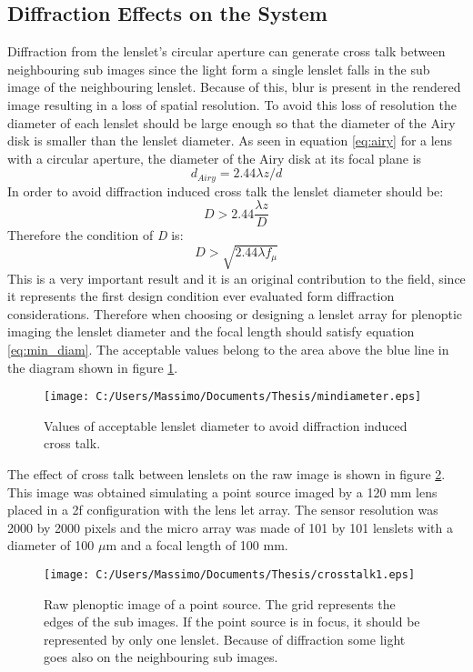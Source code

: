 \subsection{Diffraction Effects on the System}
\label{sec:diffraction}
Diffraction from the lenslet's circular aperture can generate cross talk between neighbouring sub images since the light form a single lenslet falls in the sub image of the neighbouring lenslet. Because of this, blur is present in the rendered image resulting in a loss of spatial resolution. To avoid this loss of resolution the diameter of each lenslet should be large enough so that the diameter of the Airy disk is smaller than the lenslet diameter. As seen in equation \ref{eq:airy} for a lens with a circular aperture, the diameter of the Airy disk at its focal plane is
\begin{equation}
\label{eq:airy1}
d_{Airy} = 2.44\lambda z/d
\end{equation}
 In order to avoid diffraction induced cross talk the lenslet diameter should be:
\begin{equation}
\label{eq:lenscond}
D>2.44 \dfrac{\lambda z}{D}
\end{equation} 
Therefore the condition of \textit{D} is:
\begin{equation}
\label{eq:min_diam}
D>\sqrt{2.44\lambda f_{\mu}}
\end{equation}
This is a very important result and it is an original contribution to the field, since it represents the first design condition ever evaluated form diffraction considerations. 
Therefore when choosing or designing a lenslet array for plenoptic imaging the lenslet diameter and the focal length should satisfy equation \ref{eq:min_diam}. The acceptable values belong to the area above the blue line in the diagram shown in figure \ref{fig:mindiam}.
\begin{figure}[H]
	\centering
	\texttt{[image: C:/Users/Massimo/Documents/Thesis/mindiameter.eps]}
	\caption{\label{fig:mindiam} Values of acceptable lenslet diameter to avoid diffraction induced cross talk. }
\end{figure}
The effect of cross talk between lenslets on the raw image is shown in figure \ref{fig:crosstalk1}.
This image was obtained simulating a point source imaged by a 120 mm lens placed in a 2f configuration with the lens let array. The sensor resolution was 2000 by 2000 pixels and the micro array was made of 101 by 101 lenslets with a diameter of 100 $\mu$m and a focal length of 100 mm.
\begin{figure}[H]
	\centering
	\texttt{[image: C:/Users/Massimo/Documents/Thesis/crosstalk1.eps]}
	\caption{\label{fig:crosstalk1} Raw plenoptic image of a point source. The grid represents the edges of the sub images. If the point source is in focus, it should be represented by only one lenslet. Because of diffraction some light goes also on the neighbouring sub images. }
\end{figure}
